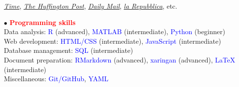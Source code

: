 \documentclass[10pt]{article}
\begin{document}
%	
%	
%	
	
	\href{http://time.com/3242/driving-over-your-best-friend-its-the-right-thing-to-do/}{\textit{Time}}, \href{http://www.huffingtonpost.com/entry/autism-empathy-brain-research_us_56f92575e4b014d3fe237413}{\textit{The Huffington Post}}, \href{http://www.dailymail.co.uk/sciencetech/article-4308284/Virtual-reality-experiment-puts-altruism-test.html}{\textit{Daily Mail}}, \href{http://www.repubblica.it/scienze/2017/04/11/news/area_cervello_perdono-162669836/?rss}{\textit{la Repubblica}}, etc.
	
	
	$\bullet$ \textcolor{red}{\textbf{Programming skills}}\\
	\hspace*{0.1in} Data analysis: \textcolor{blue}{R} (advanced), \textcolor{blue}{MATLAB} (intermediate), \textcolor{blue}{Python} (beginner)\\
	\hspace*{0.1in} Web development: \textcolor{blue}{HTML/CSS} (intermediate), \textcolor{blue}{JavaScript} (intermediate)\\
	\hspace*{0.1in} Database management: \textcolor{blue}{SQL} (intermediate)\\
	\hspace*{0.1in}	Document preparation: \textcolor{blue}{RMarkdown} (advanced), \textcolor{blue}{xaringan} (advanced), \textcolor{blue}{\LaTeX{}} (intermediate)\\
	\hspace*{0.1in} Miscellaneous: \textcolor{blue}{Git/GitHub}, \textcolor{blue}{YAML} 
	\miniskip
\end{document}
